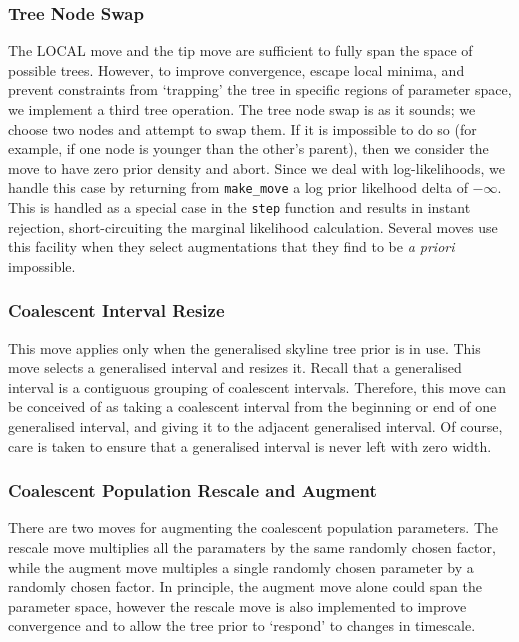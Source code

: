 \documentclass[10pt,journal,compsoc]{IEEEtran}
\begin{document}
\subsubsection{Tree Node Swap}
The LOCAL move and the tip move are sufficient to fully span the space of possible trees. However, to improve convergence, escape local minima, and prevent constraints from `trapping' the tree in specific regions of parameter space, we implement a third tree operation. The tree node swap is as it sounds; we choose two nodes and attempt to swap them. If it is impossible to do so (for example, if one node is younger than the other's parent), then we consider the move to have zero prior density and abort. Since we deal with log-likelihoods, we handle this case by returning from \texttt{make\_move} a log prior likelhood delta of $-\infty$. This is handled as a special case in the \texttt{step} function and results in instant rejection, short-circuiting the marginal likelihood calculation. Several moves use this facility when they select augmentations that they find to be \textit{a priori} impossible.

\subsubsection{Coalescent Interval Resize}

This move applies only when the generalised skyline tree prior is in use. This move selects a generalised interval and resizes it. Recall that a generalised interval is a contiguous grouping of coalescent intervals. Therefore, this move can be conceived of as taking a coalescent interval from the beginning or end of one generalised interval, and giving it to the adjacent generalised interval. Of course, care is taken to ensure that a generalised interval is never left with zero width.

\subsubsection{Coalescent Population Rescale and Augment}

There are two moves for augmenting the coalescent population parameters. The rescale move multiplies all the paramaters by the same randomly chosen factor, while the augment move multiples a single randomly chosen parameter by a randomly chosen factor. In principle, the augment move alone could span the parameter space, however the rescale move is also implemented to improve convergence and to allow the tree prior to `respond' to changes in timescale.
\end{document}
